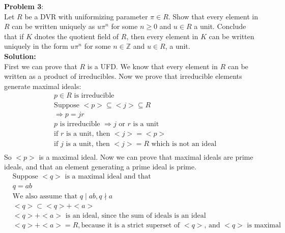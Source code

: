 \documentclass[11pt]{article}
\newcommand{\prob}[3]{\begin{flushleft}
        \textbf{Problem #1}: \\
        #2 
		\textbf{Solution:} 
		#3

\end{flushleft}}
\begin{document}
\prob{3}{
  Let $R$ be a DVR with uniformizing parameter $\pi \in R$. Show that every element in $R$ can be written uniquely as $u\pi^n$ for some $n \geq 0$ and $u \in R$ a unit.
  Conclude that if $K$ dnotes the quotient field of $R$, then every element in $K$ can be written uniquely in the form $u \pi^n$ for some $n \in \mathbb{Z}$ and $u \in R$, a unit. \\
}{ \\
  First we can prove that $R$ is a UFD. We know that every element in $R$ can be written as a product of irreducibles. Now we prove that irreducible elements generate maximal ideals:
  \begin{align*}
     & p \in R \text{ is irreducible}                                       \\
     & \text{Suppose } <p> \subseteq <j> \subseteq R                        \\
     & \Rightarrow p = jr                                                   \\
     & \text{$p$ is irreducible } \Rightarrow \text{$j $ or $r$ is a unit}  \\
     & \text{if $r$ is a unit, then } <j> = <p>                             \\
     & \text{if $j$ is a unit, then } <j> = R \text{ which is not an ideal} \\
  \end{align*}
  So $<p>$ is a maximal ideal.
  Now we can prove that maximal ideals are prime ideals, and that an element generating a prime ideal is prime.
  \begin{align*}
     & \text{Suppose $<q>$ is a maximal ideal and that }                                    \\
     & q = ab                                                                               \\
     & \text{We also assume that $q \mid ab, q \nmid a$}                                    \\
     & <q> \subset <q> + <a>                                                                \\
     & <q> + <a> \text{ is an ideal, since the sum of ideals is an ideal}                   \\
     & <q> + <a> = R, \text{because it is a strict superset of $<q>$, and $<q>$ is maximal} \\
     &                                                                                      \\

\end{align*}}
\end{document}
